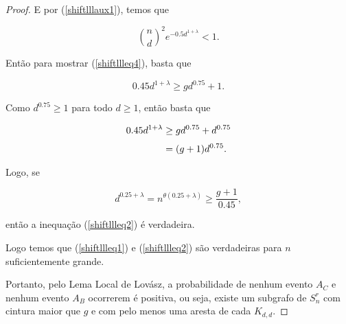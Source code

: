 \begin{proof}
E por (\ref{shiftlllaux1}), temos que

\[\binom{n}{d}^2e^{-0.5d^{1+\lambda}} < 1.\]

Então para mostrar (\ref{shiftllleq4}), basta que 

\[0.45d^{1+\lambda} \geq gd^{0.75} + 1.\]

Como $d^{0.75} \geq 1$ para todo $d \geq 1$, então basta que

\begin{equation*}
\setlength{\jot}{6pt}
\begin{aligned}
0.45d^{1+\lambda} &\geq gd^{0.75} + d^{0.75}\\
&= (g+1)d^{0.75}.
\end{aligned}
\end{equation*}

Logo, se

\[d^{0.25+\lambda} = n^{\theta(0.25+\lambda)} \geq \frac{g+1}{0.45},\]

então a inequação (\ref{shiftllleq2}) é verdadeira.



Logo temos que (\ref{shiftllleq1}) e (\ref{shiftllleq2}) são verdadeiras para $n$ suficientemente grande.

Portanto, pelo Lema Local de Lovász, a probabilidade de nenhum evento $A_C$ e nenhum evento $A_B$ ocorrerem é positiva, ou seja, existe um subgrafo de $S_n^r$ com cintura maior que $g$ e com pelo menos uma aresta de cada $K_{d,d}$.

\end{proof}

